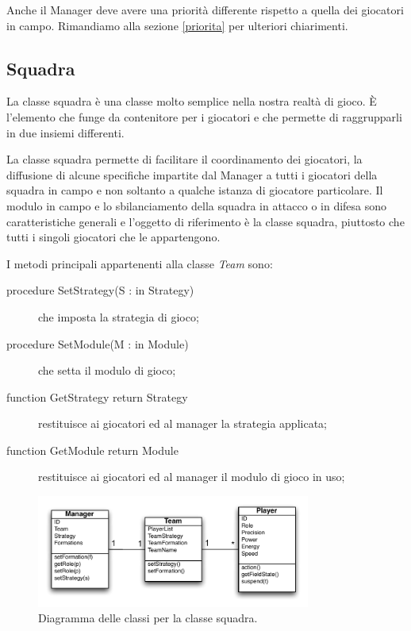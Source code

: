 \documentclass[aps,letterpaper,10pt]{article}
\begin{document}
Anche il Manager deve avere una priorit\`a differente rispetto a quella dei giocatori in campo. Rimandiamo alla sezione
\ref{priorita} per ulteriori chiarimenti.

\subsection{Squadra}
\label{squadra}

La classe squadra \`e una classe molto semplice nella nostra realt\`a di gioco. \`E l'elemento che funge da contenitore
per i giocatori e che permette di raggrupparli in due insiemi differenti. \vspace{3mm}

La classe squadra permette di facilitare il coordinamento dei giocatori, la diffusione di alcune specifiche impartite
dal Manager a tutti i giocatori della squadra in campo e non soltanto a qualche istanza di giocatore particolare. Il
modulo in campo e lo sbilanciamento della squadra in attacco o in difesa sono caratteristiche generali e l'oggetto di
riferimento \`e la classe squadra, piuttosto che tutti i singoli giocatori che le appartengono. \vspace{3mm}

I metodi principali appartenenti alla classe \emph{Team} sono:

\begin{description}
	\item[procedure SetStrategy(S : in Strategy)] che imposta la strategia di gioco;
	\item[procedure SetModule(M : in Module)] che setta il modulo di gioco;
	\item[function GetStrategy return Strategy] restituisce ai giocatori ed al manager la strategia applicata;
	\item[function GetModule return Module] restituisce ai giocatori ed al manager il modulo di gioco in uso;
\end{description}

\begin{figure}[H]
	\begin{center}
		\includegraphics[width=340px]{images/team-class.pdf}
	\end{center}
\caption{Diagramma delle classi per la classe squadra.}
\end{figure}
\end{document}
